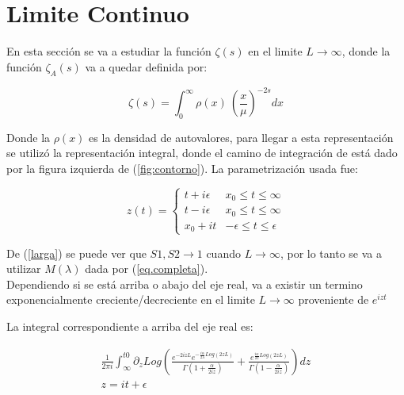 \chapter{Limite Continuo}

En esta sección se va a estudiar la función $\zeta (s) $ en el limite $L \rightarrow \infty$, donde la función $\zeta _A (s)$ va a quedar definida por:

\begin{equation}
\zeta (s) = \int _{0} ^{\infty} \rho (x) \ \left( \frac{x}{\mu } \right) ^{-2 s} dx
\end{equation}

Donde la $\rho(x) $ es la densidad de autovalores, para llegar a esta representación se utilizó la representación integral, donde el camino de integración de está dado por la figura izquierda de (\ref{fig:contorno}). La parametrización usada fue:


\[
z(t) =  
	  \begin{cases} 
      t + i \epsilon  & x _0 \leq t \leq \infty \\
      t - i \epsilon  & x _0 \leq t \leq \infty \\
      x _0 + i t		  & - \epsilon \leq t \leq \epsilon
   \end{cases}
\]

De (\ref{larga}) se puede ver que $S1,S2 \rightarrow 1$ cuando $L \rightarrow \infty$, por lo tanto se va a utilizar $M ( \lambda)$ dada por (\ref{eq.completa}).\\



Dependiendo si se está arriba o abajo del eje real, va a existir un termino exponencialmente creciente/decreciente en el limite $L \rightarrow \infty$ proveniente de $e ^{i z t}$

La integral correspondiente a arriba del eje real es:

\begin{equation}
\begin{array}{c}
\frac{ 1 }{2 \pi i} \int _{\infty} ^{t0} 
\partial _z
Log
\left(
\frac{e ^{-2 i z  L } e ^{- \frac{i \alpha}{2 \lambda} Log \left( 2 z  L \right) } }
	 {\Gamma \left( 1 + \frac{ \alpha}{2 i z } \right)} +
\frac{e ^{ \frac{i \alpha}{2 z } Log \left( 2 z  L \right)  } }{\Gamma \left( 1 - \frac{ \alpha}{2 i z } \right) }
\right) d z \\
z = i t + \epsilon 
\end{array}
\end{equation}

